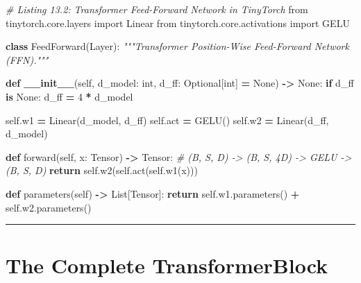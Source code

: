 \documentclass[
  letterpaper,
]{scrbook}
\newenvironment{Shaded}{\begin{snugshade}}{\end{snugshade}}
\newcommand{\BuiltInTok}[1]{#1}
\newcommand{\CommentTok}[1]{\textcolor[rgb]{0.56,0.35,0.01}{\textit{#1}}}
\newcommand{\ControlFlowTok}[1]{\textcolor[rgb]{0.13,0.29,0.53}{\textbf{#1}}}
\newcommand{\DecValTok}[1]{\textcolor[rgb]{0.00,0.00,0.81}{#1}}
\newcommand{\FunctionTok}[1]{\textcolor[rgb]{0.13,0.29,0.53}{\textbf{#1}}}
\newcommand{\ImportTok}[1]{#1}
\newcommand{\KeywordTok}[1]{\textcolor[rgb]{0.13,0.29,0.53}{\textbf{#1}}}
\newcommand{\NormalTok}[1]{#1}
\newcommand{\OperatorTok}[1]{\textcolor[rgb]{0.81,0.36,0.00}{\textbf{#1}}}
\newcommand{\VariableTok}[1]{\textcolor[rgb]{0.00,0.00,0.00}{#1}}
\begin{document}
\begin{Shaded}
\begin{Highlighting}[]
\CommentTok{\# Listing 13.2: Transformer Feed{-}Forward Network in TinyTorch}
\ImportTok{from}\NormalTok{ tinytorch.core.layers }\ImportTok{import}\NormalTok{ Linear}
\ImportTok{from}\NormalTok{ tinytorch.core.activations }\ImportTok{import}\NormalTok{ GELU}

\KeywordTok{class}\NormalTok{ FeedForward(Layer):}
    \CommentTok{"""Transformer Position{-}Wise Feed{-}Forward Network (FFN)."""}

    \KeywordTok{def} \FunctionTok{\_\_init\_\_}\NormalTok{(}\VariableTok{self}\NormalTok{, d\_model: }\BuiltInTok{int}\NormalTok{, d\_ff: Optional[}\BuiltInTok{int}\NormalTok{] }\OperatorTok{=} \VariableTok{None}\NormalTok{) }\OperatorTok{{-}\textgreater{}} \VariableTok{None}\NormalTok{:}
        \ControlFlowTok{if}\NormalTok{ d\_ff }\KeywordTok{is} \VariableTok{None}\NormalTok{:}
\NormalTok{            d\_ff }\OperatorTok{=} \DecValTok{4} \OperatorTok{*}\NormalTok{ d\_model}

        \VariableTok{self}\NormalTok{.w1 }\OperatorTok{=}\NormalTok{ Linear(d\_model, d\_ff)}
        \VariableTok{self}\NormalTok{.act }\OperatorTok{=}\NormalTok{ GELU()}
        \VariableTok{self}\NormalTok{.w2 }\OperatorTok{=}\NormalTok{ Linear(d\_ff, d\_model)}

    \KeywordTok{def}\NormalTok{ forward(}\VariableTok{self}\NormalTok{, x: Tensor) }\OperatorTok{{-}\textgreater{}}\NormalTok{ Tensor:}
        \CommentTok{\# (B, S, D) {-}\textgreater{} (B, S, 4D) {-}\textgreater{} GELU {-}\textgreater{} (B, S, D)}
        \ControlFlowTok{return} \VariableTok{self}\NormalTok{.w2(}\VariableTok{self}\NormalTok{.act(}\VariableTok{self}\NormalTok{.w1(x)))}

    \KeywordTok{def}\NormalTok{ parameters(}\VariableTok{self}\NormalTok{) }\OperatorTok{{-}\textgreater{}}\NormalTok{ List[Tensor]:}
        \ControlFlowTok{return} \VariableTok{self}\NormalTok{.w1.parameters() }\OperatorTok{+} \VariableTok{self}\NormalTok{.w2.parameters()}
\end{Highlighting}
\end{Shaded}

\begin{center}\rule{0.5\linewidth}{0.5pt}\end{center}

\section{The Complete
TransformerBlock}\label{the-complete-transformerblock}
\end{document}
